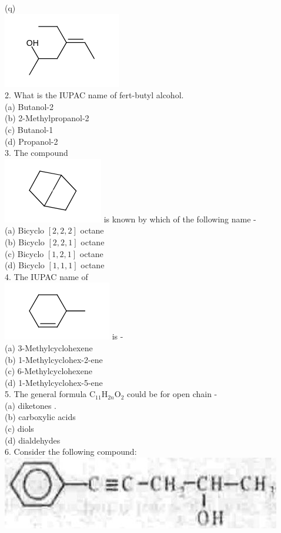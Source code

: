 \documentclass[10pt]{article}
\begin{document}
(q)\\
\includegraphics{smile-7a0a5171844ab89cd9c9667ff9c64c6bd9a73b94}\\
2. What is the IUPAC name of fert-butyl alcohol.\\
(a) Butanol-2\\
(b) 2-Methylpropanol-2\\
(c) Butanol-1\\
(d) Propanol-2\\
3. The compound\\
\includegraphics{smile-2cb3791aaa51b4d3fbec766ab9c7eab5c24125e9} is known by which of the following name -\\
(a) Bicyclo $[2,2,2]$ octane\\
(b) Bicyclo $[2,2,1]$ octane\\
(c) Bicyclo $[1,2,1]$ octane\\
(d) Bicyclo $[1,1,1]$ octane\\
4. The IUPAC name of\\
\includegraphics{smile-de3a7a7c40d213553f4443b465b61449e7e7eb06} is -\\
(a) 3-Methylcyclohexene\\
(b) 1-Methylcyclohex-2-ene\\
(c) 6-Methylcyclohexene\\
(d) 1-Methylcyclohex-5-ene\\
5. The general formula $\mathrm{C}_{11} \mathrm{H}_{2 n} \mathrm{O}_{2}$ could be for open chain -\\
(a) diketones .\\
(b) carboxylic acids\\
(c) diols\\
(d) dialdehydes\\
6. Consider the following compound:\\
\includegraphics[max width=\textwidth, center]{2025_01_28_8470952b98110cec3aabg-038}
\end{document}
